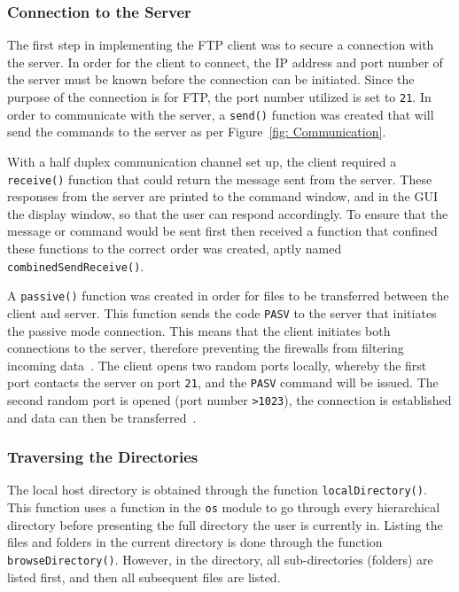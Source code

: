 \documentclass[10pt,twocolumn]{witseiepaper}
\def\code#1{\texttt{#1}}
\begin{document}
\subsubsection{Connection to the Server}
\label{sec: Connection to server}
The first step in implementing the FTP client was to secure a connection with the server. In order for the client to connect, the IP address and port number of the server must be known before the connection can be initiated. Since the purpose of the connection is for FTP, the port number utilized is set to \code{21}. In order to communicate with the server, a \code{send()} function was created that will send the commands to the server as per Figure~\ref{fig: Communication}.

With a half duplex communication channel set up, the client required a \code{receive()} function that  could return the message sent from the server. These responses from the server are printed to the command window, and in the GUI the display window, so that the user can respond accordingly. To ensure that the message or command would be sent first then received a function that confined these functions to the correct order was created, aptly named \code{combinedSendReceive()}.

A \code{passive()} function was created in order for files to be transferred between the client and server. This function sends the code \code{PASV} to the server that initiates the passive mode connection. This means that the client initiates both connections to the server, therefore preventing the firewalls from filtering incoming data~\cite{passive}. The client opens two random ports locally, whereby the first port contacts the server on port \code{21}, and the \code{PASV} command will be issued. The second random port is opened (port number \code{>1023}), the connection is established and data can then be transferred~\cite{passive}.

\subsubsection{Traversing the Directories}
\label{sec: Traversing directories}
The local host directory is obtained through the function \code{localDirectory()}. This function uses a function in the \code{os} module to go through every hierarchical directory before presenting the full directory the user is currently in. Listing the files and folders in the current directory is done through the function \code{browseDirectory()}. However, in the directory, all sub-directories (folders) are listed first, and then all subsequent files are listed.
\end{document}
